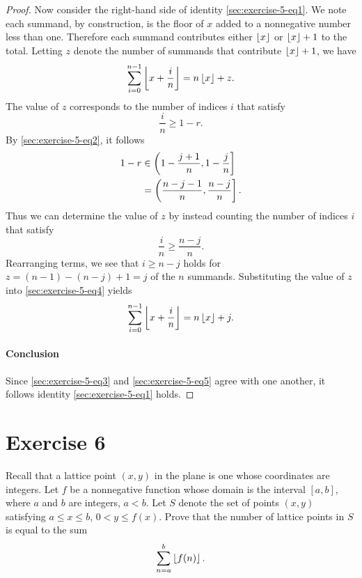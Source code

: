\documentclass{article}
\begin{document}
\begin{proof}
    Now consider the right-hand side of identity \eqref{sec:exercise-5-eq1}.
    We note each summand, by construction, is the floor of $x$ added to a
      nonnegative number less than one.
    Therefore each summand contributes either $\left\lfloor x\right\rfloor$ or $\left\lfloor x\right\rfloor + 1$ to
      the total.
    Letting $z$ denote the number of summands that contribute $\left\lfloor x\right\rfloor + 1$,
      we have
      \begin{equation}
        \label{sec:exercise-5-eq4}
        \sum_{i=0}^{n-1} \left\lfloor x + \frac{i}{n}\right\rfloor = n\left\lfloor x\right\rfloor + z.
      \end{equation}
    The value of $z$ corresponds to the number of indices $i$ that satisfy
      $$\frac{i}{n} \geq 1 - r.$$
    By \eqref{sec:exercise-5-eq2}, it follows
      \begin{align*}
        1 - r
          & \in \left(1 - \frac{j+1}{n}, 1-\frac{j}{n}\right] \\
          & = \left(\frac{n - j - 1}{n}, \frac{n - j}{n}\right].
      \end{align*}
    Thus we can determine the value of $z$ by instead counting the number of
      indices $i$ that satisfy $$\frac{i}{n} \geq \frac{n - j}{n}.$$
    Rearranging terms, we see that $i \geq n - j$ holds for
      $z = (n - 1) - (n - j) + 1 = j$ of the $n$ summands.
    Substituting the value of $z$ into \eqref{sec:exercise-5-eq4} yields
      \begin{equation}
        \label{sec:exercise-5-eq5}
        \sum_{i=0}^{n-1} \left\lfloor x + \frac{i}{n}\right\rfloor = n\left\lfloor x\right\rfloor + j.
      \end{equation}

  \paragraph{Conclusion}%

    Since \eqref{sec:exercise-5-eq3} and \eqref{sec:exercise-5-eq5} agree with
    one another, it follows identity \eqref{sec:exercise-5-eq1} holds.

\end{proof}

\section{Exercise 6}%
\label{sec:exercise-6}

Recall that a lattice point $(x, y)$ in the plane is one whose coordinates are
  integers.
Let $f$ be a nonnegative function whose domain is the interval $[a, b]$, where
  $a$ and $b$ are integers, $a < b$.
Let $S$ denote the set of points $(x, y)$ satisfying $a \leq x \leq b$,
  $0 < y \leq f(x)$.
Prove that the number of lattice points in $S$ is equal to the sum
  $$\sum_{n=a}^b \left\lfloor f(n)\right\rfloor.$$
\end{document}
